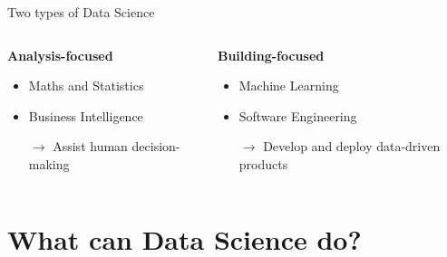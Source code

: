 \begin{frame}{Two types of Data Science}
    \begin{columns}
        \begin{column}{0.5\textwidth}
            \begin{center}
                \large\bf%
                Analysis\hyp{}focused
            \end{center}
            \begin{itemize}
                \item Maths and Statistics
                \item Business Intelligence
                \item[$\to$] Assist human decision\hyp{}making
            \end{itemize}
        \end{column}
        \begin{column}{0.5\textwidth}
            \begin{center}
                \large\bf%
                Building\hyp{}focused
            \end{center}
            \begin{itemize}
                \item Machine Learning
                \item Software Engineering
                \item[$\to$] Develop and deploy data\hyp{}driven products
            \end{itemize}
        \end{column}
    \end{columns}
\end{frame}

\section{What can Data Science do?}

